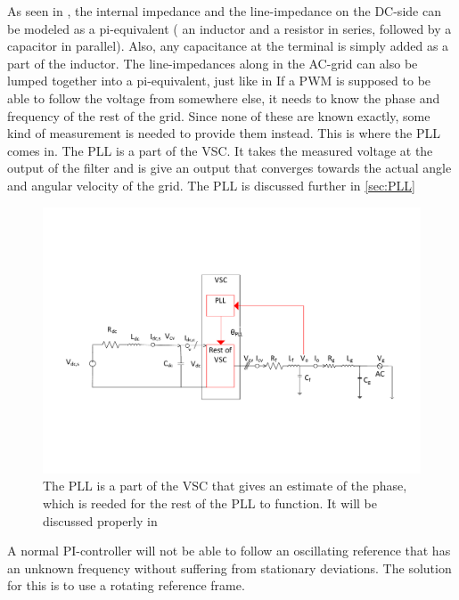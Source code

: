 As seen in \cite{Suul_paper_1}, the internal impedance and the line-impedance on the DC-side can be modeled as a pi-equivalent ( an inductor and a resistor in series, followed by a capacitor in parallel). Also, any capacitance at the terminal is simply added as a part of the inductor. The line-impedances along in the AC-grid can also be lumped together into a pi-equivalent, just like in \cite{Suul_paper_1}
\noindent
If a \gls{PWM} is supposed to be able to follow the voltage from somewhere else, it needs to know the phase and frequency of the rest of the grid. Since none of these are known exactly, some kind of measurement is needed to provide them instead. This is where the \gls{PLL} comes in. The \gls{PLL} is a part of the \gls{VSC}. It takes the measured voltage at the output of the filter and is give an output that converges towards the actual angle and angular velocity of the grid. The \gls{PLL} is discussed further in \cref{sec:PLL}


\begin{figure}[ht!]
 \centering
 \includegraphics[width=\textwidth,height=\textheight,keepaspectratio]{Figures/Transformer_with_PLL.pdf} %
 \caption{The \gls{PLL} is a part of the \gls{VSC} that gives an estimate of the phase, which is reeded for the rest of the \gls{PLL} to function. It will be discussed properly in }
 \label{fig:curcuit_with_pll}
\end{figure}

A normal PI-controller will not be able to follow an oscillating reference that has an unknown frequency without suffering from stationary deviations. The solution for this is to use a rotating reference frame. 


